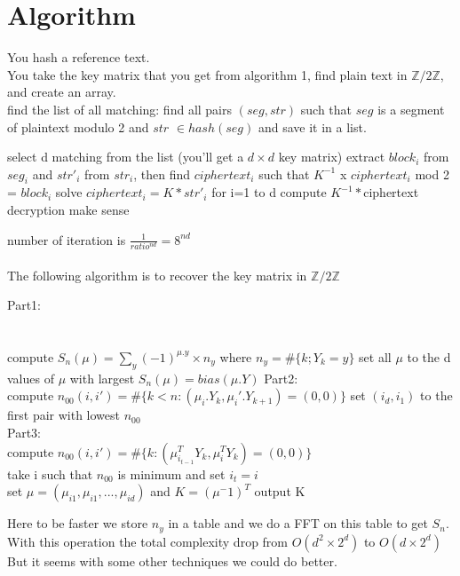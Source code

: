 \documentclass{article}
\begin{document}
\section*{Algorithm}
You hash a reference text.\\
You take the key matrix that you get from algorithm 1, find plain text in $\mathbb{Z}/2\mathbb{Z}$, and create an array.\\
find the list of all matching: find all pairs $(seg,str)$ such that $seg$ is a segment of plaintext modulo 2 and $str$ $\in hash(seg)$ and save it in a list.\\
\begin{algorithmic}[1]
	\REPEAT
\STATE select d matching from the list (you'll get a $d\times d$ key matrix)
	\STATE extract $block_{i}$ from $seg_{i}$ and $str'_{i}$ from $str_{i}$,
	\STATE then find $ciphertext_{i}$ such that $K^{-1}$ x $ciphertext_{i}$ mod 2 = $block_{i}$
\ENDFOR
\STATE solve $ciphertext_{i} = K * str'_{i}$ for i=1 to d
\STATE compute $K^{-1} * $ciphertext
\UNTIL decryption make sense
\end{algorithmic}
number of iteration is $ \frac{1}{ratio^{nd}} = 8^{nd}$
\\
\\
The following algorithm is to recover the key matrix in $\mathbb{Z}/2\mathbb{Z}$\\
\begin{algorithmic}[1]
\STATE Part1:\\
\\
\\
\FORALL{$\mu$}
	\STATE compute $S_n(\mu) = \sum_{y}{(-1)^{\mu.y} \times n_y}$ where $n_y=\#\{k;Y_k=y\}$
\ENDFOR
\STATE set all $\mu$ to the d values of $\mu$ with largest $S_n(\mu)=bias(\mu.Y)$
\STATE Part2:\\
	\STATE compute $n_{00}(i,i')=\#\{k<n:(\mu_i .Y_k,\mu_i'.Y_{k+1})=(0,0)\}$
\ENDFOR
\STATE set $(i_d,i_1)$ to the first pair with lowest $n_{00}$
\\
\STATE Part3:\\
		\STATE compute $n_{00}(i,i{'})=\#\{k:(\mu^{T}_{i_{t-1}}Y_{k},\mu^{T}_{i}Y_{k})=(0,0)\}$\\
	\ENDFOR
	\STATE take i such that $n_{00}$ is minimum and set $i_t=i$\\
\ENDFOR
\STATE set $\mu = (\mu_{i1},\mu_{i1},...,\mu_{id})$ and $K=(\mu^-1)^T$
\STATE output K
\end{algorithmic}
Here to be faster we store $n_y$ in a table and we do a FFT on this table to get $S_n$. With this operation the total complexity drop from $O(d^2 \times 2^d)$ to $O(d \times 2^d)$
But it seems with some other techniques we could do better.
\end{document}
